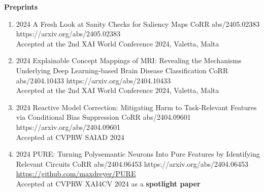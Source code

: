 \headedsection %
{\bf Preprints}{}
{
    \begin{enumerate}

        \item {}
                        {2024}
                        {A Fresh Look at Sanity Checks for Saliency Maps}
                        {CoRR abs/2405.02383}
                        {https://arxiv.org/abs/2405.02383}
                        {\\ Accepted at the 2nd XAI World Conference 2024, Valetta, Malta}

        \item {}
                        {2024}
                        {Explainable Concept Mappings of MRI: Revealing the Mechanisms Underlying Deep Learning-based Brain Disease Classification}
                        {CoRR abs/2404.10433}
                        {https://arxiv.org/abs/2404.10433}
                        {\\ Accepted at the 2nd XAI World Conference 2024, Valetta, Malta}


        \item {}
                        {2024}
                        {Reactive Model Correction: Mitigating Harm to Task-Relevant Features via Conditional Bias Suppression}
                        {CoRR abs/2404.09601}
                        {https://arxiv.org/abs/2404.09601}
                        {\\ Accepted at CVPRW SAIAD 2024}

        \item {}
                        {2024}
                        {PURE: Turning Polysemantic Neurons Into Pure Features by Identifying Relevant Circuits}
                        {CoRR abs/2404.06453}
                        {https://arxiv.org/abs/2404.06453}
                        {\\\href{https://github.com/maxdreyer/PURE}{https://github.com/maxdreyer/PURE}\\
                        Accepted at CVPRW XAI4CV 2024 as a \textbf{spotlight paper}}


\end{enumerate}}
